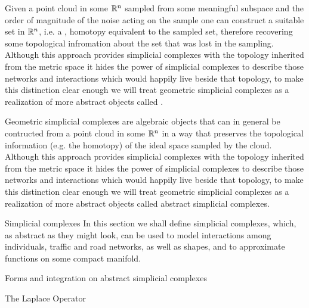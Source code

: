 \documentclass[../main.tex]{subfiles}
\begin{document}
     
    Given a point cloud in some $\mathbb{R}^n$ sampled from some meaningful subspace and the order of magnitude of the noise acting on the sample one can 
    construct a suitable set in $\mathbb{R}^n$, i.e. a , homotopy equivalent to the sampled set, therefore recovering some
    topological infromation about the set that was lost in the sampling. 
    Although this approach provides simplicial complexes with the topology inherited from the metric space it hides the power of simplicial complexes 
    to describe those networks and interactions which would happily live beside that topology, to make this distinction clear enough we will treat geometric 
    simplicial complexes as a realization of more abstract objects called .

    {\color{red}
    Geometric simplicial complexes are algebraic objects that can in general be contructed
    from a point cloud in some $\mathbb{R}^n$ in a way that preserves the topological information (e.g. the homotopy) of the ideal space
    sampled by the cloud. Although this approach provides simplicial complexes with the topology inherited from the metric space 
    it hides the power of simplicial complexes to describe those networks and interactions which would happily live beside that topology,
    to make this distinction clear enough we will treat geometric simplicial complexes as a realization of more abstract objects called
    abstract simplicial complexes.}
       
    \begin{section}{Simplicial complexes}
        {\color{red} In this section we shall define simplicial complexes, which, as abstract as they might look, can 
        be used to model interactions among individuals, traffic and road networks, as well as shapes, and 
        to approximate functions on some compact manifold.}
            
    \end{section}
    \begin{section}{Forms and integration on abstract simplicial complexes}
            
    \end{section}
    \begin{section}{The Laplace Operator}
    \end{section}
\end{document}
